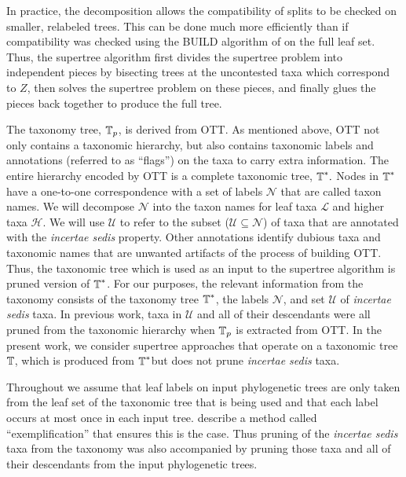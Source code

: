 \documentclass[english]{article}
\begin{document}
In practice, the decomposition allows the compatibility of splits to
be checked on smaller, relabeled trees.
This can be done much more
efficiently than if compatibility was checked using the BUILD
algorithm of \citet{AhoSSU1981} on the full leaf set.
Thus, the
supertree algorithm first divides the supertree problem into
independent pieces by bisecting trees at the uncontested taxa which
correspond to $Z$, then solves the supertree problem on these pieces,
and finally glues the pieces back together to produce the full tree.

The taxonomy tree, $\mbox{\ensuremath{\mathbb{T}}}_{p}$, is derived from OTT.
As mentioned
above, OTT not only contains a taxonomic hierarchy, but also contains
taxonomic labels and annotations (referred to as ``flags'') on the
taxa to carry extra information.
The entire hierarchy encoded by OTT is
a complete taxonomic tree, $\mbox{\ensuremath{\mathbb{T}}}^{\ast}.$ Nodes in
$\mbox{\ensuremath{\mathbb{T}}}^{\ast}$ have a one-to-one correspondence with a set of
labels $\mathcal{N}$ that are called taxon names.
We will decompose
$\mathcal{N}$ into the taxon names for leaf taxa \emph{$\mathcal{L}$
}and higher taxa $\mathcal{H}$.
We will use $\mathcal{U}$ to refer to
the subset ($\mathcal{U}\subseteq\mathcal{N}$) of taxa that are
annotated with the \emph{incertae sedis }property.
Other annotations
identify dubious taxa and taxonomic names that are unwanted artifacts
of the process of building OTT.
Thus, the taxonomic tree which is used
as an input to the supertree algorithm is pruned version of
$\mbox{\ensuremath{\mathbb{T}}}^{\ast}$.
For our purposes, the relevant information from
the taxonomy consists of the taxonomy tree $\mbox{\ensuremath{\mathbb{T}}}^{\ast}$, the
labels $\mathcal{N}$, and set $\mathcal{U}$ of \emph{incertae sedis} taxa.
In previous work, taxa in $\mathcal{U}$ and all of their descendants 
were all pruned from
the taxonomic hierarchy when $\mbox{\ensuremath{\mathbb{T}}}_{p}$ is extracted from OTT.
In
the present work, we consider supertree approaches that operate on a
taxonomic tree $\mbox{\ensuremath{\mathbb{T}}}$, which is produced from
$\mbox{\ensuremath{\mathbb{T}}}^{\ast}$but does not prune \emph{incertae sedis} taxa.

Throughout we assume that leaf labels on input phylogenetic trees are
only taken from the leaf set of the taxonomic tree that is being used
and that each label occurs at most once in each input tree.
\citet{redelings2017supertree} describe a method called
``exemplification'' that ensures this is the case.
Thus pruning of the
\emph{incertae sedis} taxa from the taxonomy was also accompanied by
pruning those taxa and all of their descendants from the input phylogenetic
trees.
\end{document}
